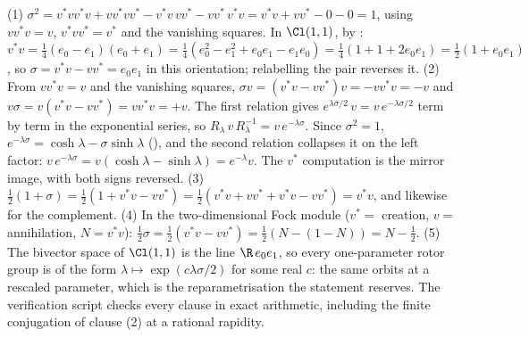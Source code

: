 (1) $\sigma^2 = v^*vv^*v + vv^*vv^* - v^*v\,vv^* - vv^*\,v^*v = v^*v + vv^* - 0 - 0 = 1$, using $vv^*v = v$, $v^*vv^* = v^*$ and the vanishing squares. In $\Cl(1,1)$, by : $v^*v = \tfrac14(e_0 - e_1)(e_0 + e_1) = \tfrac14(e_0^2 - e_1^2 + e_0e_1 - e_1e_0) = \tfrac14(1 + 1 + 2e_0e_1) = \tfrac12(1 + e_0e_1)$, so $\sigma = v^*v - vv^* = e_0e_1$ in this orientation; relabelling the pair reverses it. (2) From $vv^*v = v$ and the vanishing squares, $\sigma v = (v^*v - vv^*)v = -vv^*v = -v$ and $v\sigma = v(v^*v - vv^*) = vv^*v = +v$. The first relation gives $e^{\lambda\sigma/2}\,v = v\,e^{-\lambda\sigma/2}$ term by term in the exponential series, so $R_\lambda\, v\, R_\lambda^{-1} = v\,e^{-\lambda\sigma}$. Since $\sigma^2 = 1$, $e^{-\lambda\sigma} = \cosh\lambda - \sigma\sinh\lambda$ (), and the second relation collapses it on the left factor: $v\,e^{-\lambda\sigma} = v(\cosh\lambda - \sinh\lambda) = e^{-\lambda}v$. The $v^*$ computation is the mirror image, with both signs reversed. (3) $\tfrac12(1 + \sigma) = \tfrac12(1 + v^*v - vv^*) = \tfrac12(v^*v + vv^* + v^*v - vv^*) = v^*v$, and likewise for the complement. (4) In the two-dimensional Fock module ($v^* = $ creation, $v = $ annihilation, $N = v^*v$): $\tfrac12\sigma = \tfrac12(v^*v - vv^*) = \tfrac12(N - (1 - N)) = N - \tfrac12$. (5) The bivector space of $\Cl(1,1)$ is the line $\R\,e_0e_1$, so every one-parameter rotor group is of the form $\lambda \mapsto \exp(c\lambda\sigma/2)$ for some real $c$: the same orbits at a rescaled parameter, which is the reparametrisation the statement reserves. The verification script checks every clause in exact arithmetic, including the finite conjugation of clause (2) at a rational rapidity.
